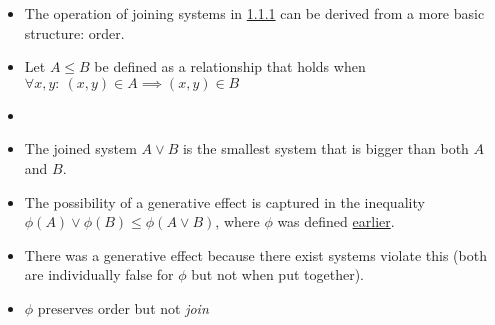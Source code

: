 \begin{itemize}
    \item The operation of joining systems in \hyperref[1.1.1]{1.1.1} can be derived from a more basic structure: order.

    \item Let $A \leq B$ be defined as a relationship that holds when $\forall x,y:\ (x,y) \in A \implies (x,y) \in B$
    \item  {}
    \item  The joined system $A \lor B$ is the smallest system that is bigger than both $A$ and $B$.
    \item The possibility of a generative effect is captured in the inequality $\phi(A) \lor \phi(B) \leq \phi(A \lor B)$, where $\phi$ was defined \href{doc/1 math/Seven Sketches in Compositionality/1 Generative Effects/1 More than the sum of their parts/1 A first look at generative effects|reference}{earlier}.
    \item There was a generative effect because there exist systems violate this (both are individually false for $\phi$ but not when put together).
    \item $\phi$ preserves order but not \emph{join}
  \end{itemize}